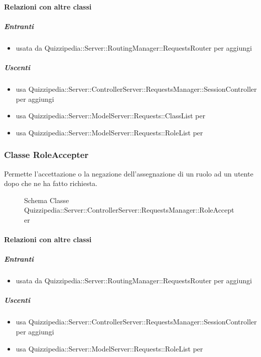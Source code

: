 \paragraph{Relazioni con altre classi}
\subparagraph{Entranti}
\begin{itemize}
\item usata da Quizzipedia::Server::RoutingManager::RequestsRouter per aggiungi
\end{itemize}
\subparagraph{Uscenti}
\begin{itemize}
\item usa Quizzipedia::Server::ControllerServer::RequestsManager::SessionController per aggiungi
\item usa Quizzipedia::Server::ModelServer::Requests::ClassList per 
\item usa Quizzipedia::Server::ModelServer::Requests::RoleList per 
\end{itemize}
\subsubsection{Classe RoleAccepter}
Permette l'accettazione o la negazione dell'assegnazione di un ruolo ad un utente dopo che ne ha fatto richiesta.
\begin{figure}[H]
\centering
\noindent{}
\caption[Schema Classe RoleAccepter]{Schema Classe Quizzipedia::Server::ControllerServer::RequestsManager::RoleAccepter}
\end{figure}
\paragraph{Relazioni con altre classi}
\subparagraph{Entranti}
\begin{itemize}
\item usata da Quizzipedia::Server::RoutingManager::RequestsRouter per aggiungi
\end{itemize}
\subparagraph{Uscenti}
\begin{itemize}
\item usa Quizzipedia::Server::ControllerServer::RequestsManager::SessionController per aggiungi
\item usa Quizzipedia::Server::ModelServer::Requests::RoleList per 
\end{itemize}
